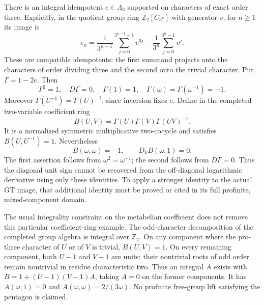 There is an integral idempotent $e\in\Lambda_3$ supported on
characters of exact order three.  Explicitly, in the quotient
group ring $\mathbb Z_2[C_{3^n}]$ with generator $v$, for $n\geq1$
its image is
\[
 e_n=\frac1{3^{n-1}}\sum_{j=0}^{3^{n-1}-1}v^{3j}
       -\frac1{3^n}\sum_{j=0}^{3^n-1}v^j.
\]
These are compatible idempotents: the first summand projects
onto the characters of order dividing three and the second onto
the trivial character.  Put $\Gamma=1-2e$.  Then
\[
 \Gamma^2=1,\quad D\Gamma=0,\quad \Gamma(1)=1,
 \quad \Gamma(\omega)=\Gamma(\omega^{-1})=-1.
\]
Moreover $\Gamma(U^{-1})=\Gamma(U)^{-1}$, since inversion fixes
$e$.  Define in the completed two-variable coefficient ring
\[
 B(U,V)=\Gamma(U)\Gamma(V)\Gamma(UV)^{-1}.
\]
It is a normalized symmetric multiplicative two-cocycle and
satisfies $B(U,U^{-1})=1$.  Nevertheless
\[
 B(\omega,\omega)=-1,
 \qquad D_VB(\omega,1)=0.
\]
The first assertion follows from $\omega^2=\omega^{-1}$;
the second follows from $D\Gamma=0$.  Thus the diagonal unit
sign cannot be recovered from the off-diagonal logarithmic
derivative using only these identities.  To apply a stronger
identity to the actual GT image, that additional identity must
be proved or cited in its full profinite, mixed-component domain.

The usual integrality constraint on the metabelian coefficient
does not remove this particular coefficient-ring example.
The odd-character decomposition of the completed group algebra
is integral over $\mathbb Z_2$.  On any component where the
pro-three character of $U$ or of $V$ is trivial, $B(U,V)=1$.
On every remaining component, both $U-1$ and $V-1$ are units:
their nontrivial roots of odd order remain nontrivial in residue
characteristic two.  Thus an integral $A$ exists with
$B=1+(U-1)(V-1)A$, taking $A=0$ on the former components.
It has $A(\omega,1)=0$ and
$A(\omega,\omega)=2/(3\omega)$.
No profinite free-group lift satisfying the pentagon is claimed.


